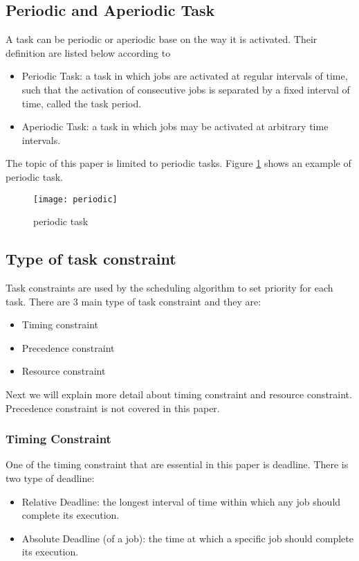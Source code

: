 \subsection{Periodic and Aperiodic Task}

A task can be periodic or aperiodic base on the way it is activated. Their definition are listed below according to \cite{b4}
\begin{itemize}
\item Periodic Task: a task in which jobs are activated at regular intervals of time, such that the activation of consecutive jobs is separated by a fixed interval of time, called the task period.
\item Aperiodic Task: a task in which jobs may be activated at arbitrary time intervals.
\end{itemize}

The topic of this paper is limited to periodic tasks. Figure \ref{fig:periodic} shows an example of periodic task.

\begin{figure}[h]
    \centering
    \texttt{[image: periodic]}
    \caption{periodic task \cite{b5}}
    \label{fig:periodic}
\end{figure}

\subsection{Type of task constraint}

Task constraints are used by the scheduling algorithm to set  priority for each task. There are 3 main type of task constraint and they are:

\begin{itemize}
\item Timing constraint
\item Precedence constraint
\item Resource constraint
\end{itemize}

Next we will explain more detail about timing constraint and resource constraint. Precedence constraint is not covered in this paper. 

\subsubsection{Timing Constraint}

One of the timing constraint that are essential in this paper is deadline. There is two type of deadline:
\begin{itemize}
\item Relative Deadline: the longest interval of time within which any job should complete its execution\cite{b4}.
\item Absolute Deadline (of a job): the time at which a specific job should complete its execution\cite{b4}.
\end{itemize}

